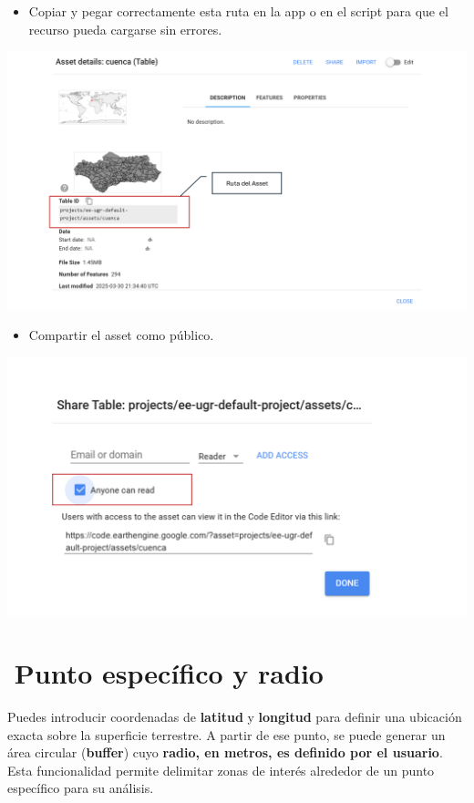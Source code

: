\documentclass[
]{book}
\providecommand{\tightlist}{%
  \setlength{\itemsep}{0pt}\setlength{\parskip}{0pt}}
\begin{document}
\begin{itemize}
\tightlist
\item
  Copiar y pegar correctamente esta ruta en la app o en el script para que el recurso pueda cargarse sin errores.
\end{itemize}

\includegraphics{assets/asset1_es.png}

\begin{itemize}
\tightlist
\item
  Compartir el asset como público.
\end{itemize}

\includegraphics{assets/asset_2.png}

\section{\texorpdfstring{\textbf{📌Punto específico y radio}}{📌Punto específico y radio}}\label{punto-especuxedfico-y-radio}

Puedes introducir coordenadas de \textbf{latitud} y \textbf{longitud} para definir una ubicación exacta sobre la superficie terrestre. A partir de ese punto, se puede generar un área circular (\textbf{buffer}) cuyo \textbf{radio, en metros, es definido por el usuario}. Esta funcionalidad permite delimitar zonas de interés alrededor de un punto específico para su análisis.
\end{document}
